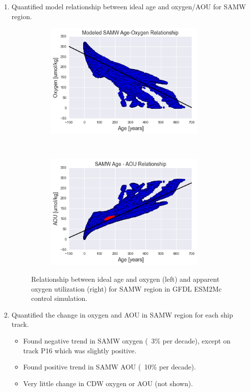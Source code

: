 \documentclass[11pt]{article}
\begin{document}
\begin{enumerate}

\item Quantified model relationship between ideal age and oxygen/AOU for SAMW region.

\begin{figure}[h!]
    \centering
    \begin{subfigure}[t]{0.5\textwidth}
        \centering
        \includegraphics[height=2.25in]{modeled_samw_age_o2.png}
    \end{subfigure}%
    ~
    \begin{subfigure}[t]{0.5\textwidth}
        \centering
        \includegraphics[height=2.25in]{modeled_samw_age_aou.png}
    \end{subfigure}
    \caption{Relationship between ideal age and oxygen (left) and apparent oxygen
    utilization (right) for SAMW region in GFDL ESM2Mc control simulation.}
\end{figure}

\item Quantified the change in oxygen and AOU in SAMW region for each ship track.
\begin{itemize}
  \item Found negative trend in SAMW oxygen (~3\% per decade), except on track
  P16 which was slightly positive.
  \item Found positive trend in SAMW AOU (~10\% per decade).
  \item Very little change in CDW oxygen or AOU (not shown).
\end{itemize}


\end{enumerate}
\end{document}

